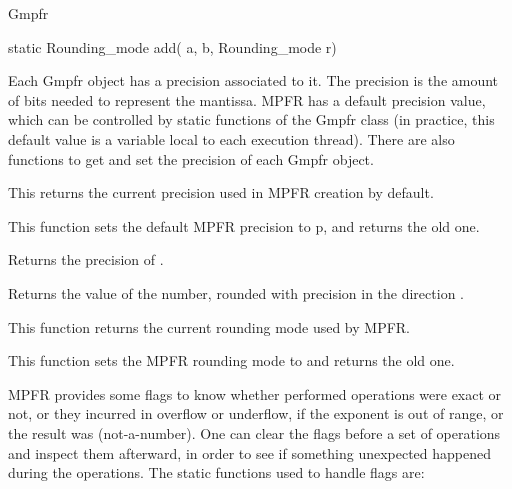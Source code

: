 \begin{ccRefClass} {Gmpfr}
\ccOperations

\ccSetThreeColumns
        {static Rounding\_mode}
        {add( a, b, Rounding\_mode r)}
        {}


Each Gmpfr object has a precision associated to it. The precision is the
amount of bits needed to represent the mantissa. MPFR has a default
precision value, which can be controlled by static functions of the Gmpfr
class (in practice, this default value is a variable local to each
execution thread). There are also functions to get and set the precision of
each Gmpfr object.

        {This returns the current precision used in MPFR creation
        by default.}

        {This function sets the default MPFR precision to p, and returns
        the old one.}

        {Returns the precision of \ccVar.}

        {Returns the value of the number, rounded with precision 
        in the direction .}


        {This function returns the current rounding mode used by MPFR.}

        {This function sets the MPFR rounding mode to  and returns
        the old one.}



MPFR provides some flags to know whether performed operations were exact
or not, or they incurred in overflow or underflow, if the exponent is
out of range, or the result was  (not-a-number). One can clear the
flags before a set of operations and inspect them afterward, in order to
see if something unexpected happened during the operations. The static
functions used to handle flags are:


\end{ccRefClass}
